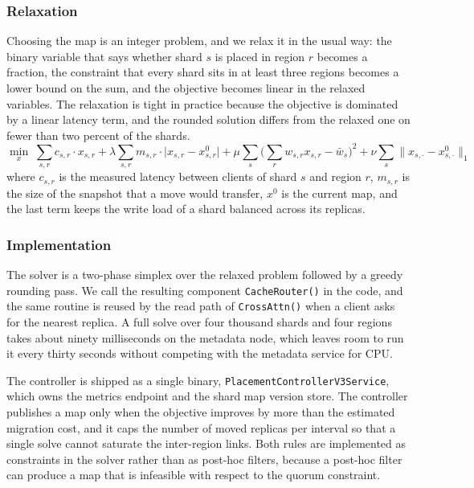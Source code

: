 ﻿\documentclass[10pt,twocolumn,letterpaper]{article}
\begin{document}
\subsubsection{Relaxation}
Choosing the map is an integer problem, and we relax it in the usual way: the binary
variable that says whether shard $s$ is placed in region $r$ becomes a fraction, the
constraint that every shard sits in at least three regions becomes a lower bound on the
sum, and the objective becomes linear in the relaxed variables. The relaxation is tight
in practice because the objective is dominated by a linear latency term, and the rounded
solution differs from the relaxed one on fewer than two percent of the shards.
\begin{equation}
\min_{x} \; \sum_{s,r} c_{s,r} \cdot x_{s,r} + \lambda \sum_{s,r} m_{s,r} \cdot \lvert x_{s,r} - x^{0}_{s,r} \rvert + \mu \sum_{s} \Big( \sum_{r} w_{s,r} x_{s,r} - \bar{w}_{s} \Big)^{2} + \nu \sum_{s} \big\lVert x_{s,\cdot} - x^{0}_{s,\cdot} \big\rVert_{1}
\end{equation}
where $c_{s,r}$ is the measured latency between clients of shard $s$ and region $r$,
$m_{s,r}$ is the size of the snapshot that a move would transfer, $x^{0}$ is the current
map, and the last term keeps the write load of a shard balanced across its replicas.

\subsubsection{Implementation}
The solver is a two-phase simplex over the relaxed problem followed by a greedy rounding
pass. We call the resulting component \texttt{CacheRouter()} in the code, and the same
routine is reused by the read path of \texttt{CrossAttn()} when a client asks for the
nearest replica. A full solve over four thousand shards and four regions takes about
ninety milliseconds on the metadata node, which leaves room to run it every thirty
seconds without competing with the metadata service for CPU.

The controller is shipped as a single binary, \texttt{PlacementControllerV3Service}, which owns the metrics endpoint and the shard map version store. The controller publishes a map only when the objective improves by more than the
estimated migration cost, and it caps the number of moved replicas per interval so that
a single solve cannot saturate the inter-region links. Both rules are implemented as
constraints in the solver rather than as post-hoc filters, because a post-hoc filter can
produce a map that is infeasible with respect to the quorum constraint.
\end{document}
